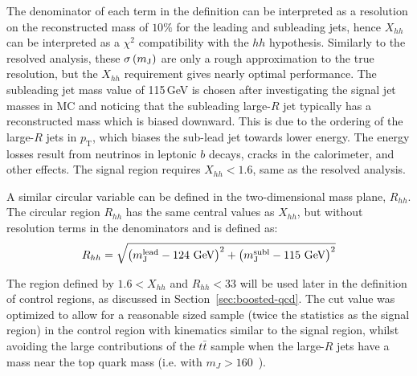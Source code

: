 The denominator of each term in the definition can be interpreted as a resolution on the reconstructed mass of $10\%$ for the leading and subleading jets, hence $X_{hh}$ can be interpreted as a $\chi^2$ compatibility with the $hh$ hypothesis. Similarly to the resolved analysis, these $\sigma \left(m_{\rm J}\right)$ are only a rough approximation to the true resolution, but the $X_{hh}$ requirement gives nearly optimal performance. The subleading jet mass value of 115\,GeV  is chosen after investigating the signal jet masses in MC and noticing that the subleading large-$R$ jet typically has a reconstructed mass which is biased downward. This is due to the ordering of the large-$R$ jets in $p_\text{T}$, which biases the sub-lead jet towards lower energy. The energy losses result from neutrinos in leptonic $b$ decays, cracks in the calorimeter, and other effects. The signal region requires $X_{hh} < 1.6$, same as the resolved analysis. 


A similar circular variable can be defined in the two-dimensional mass plane, $R_{hh}$. The circular region $R_{hh}$ has the same central values as $X_{hh}$, but without resolution terms in the denominators and is defined as:
\begin{equation}
\label{eq:boosted_RhhDef}
R_{hh} = \sqrt{\left(m^{\rm lead}_{\rm J} - \text{124 GeV}\right)^2 + \left(m^{\rm subl}_{\rm J} - \text{115 GeV}\right)^2}
\end{equation}

The region defined by $1.6 < X_{hh}$ and $R_{hh} < 33$ will be used later in the definition of control regions, as discussed in Section~\ref{sec:boosted-qcd}. The cut value was optimized to allow for a reasonable sized sample (twice the statistics as the signal region) in the control region with kinematics similar to the signal region, whilst avoiding the large contributions of the $t\bar{t}$ sample when the large-$R$ jets have a mass near the top quark mass (i.e. with $m_J > 160$~\GeV).

